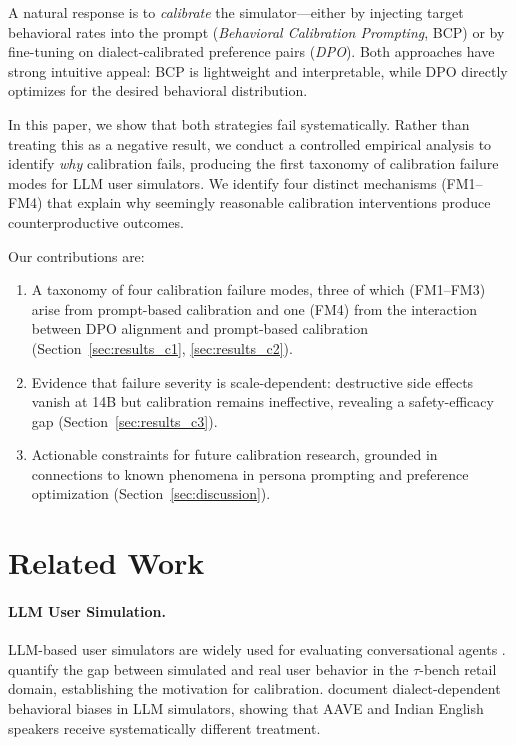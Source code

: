 \documentclass[11pt,a4paper]{article}
\newcommand{\fm}[1]{\textsc{FM#1}}
\newcommand{\bcp}{\textsc{BCP}}
\newcommand{\taubench}{$\tau$-bench}
\begin{document}
A natural response is to \emph{calibrate} the simulator---either by injecting target behavioral rates into the prompt (\emph{Behavioral Calibration Prompting}, \bcp{}) or by fine-tuning on dialect-calibrated preference pairs (\emph{DPO}).
Both approaches have strong intuitive appeal: \bcp{} is lightweight and interpretable, while DPO directly optimizes for the desired behavioral distribution.

In this paper, we show that both strategies fail systematically.
Rather than treating this as a negative result, we conduct a controlled empirical analysis to identify \emph{why} calibration fails, producing the first taxonomy of calibration failure modes for LLM user simulators.
We identify four distinct mechanisms (\fm{1}--\fm{4}) that explain why seemingly reasonable calibration interventions produce counterproductive outcomes.

Our contributions are:
\begin{enumerate}[nosep]
    \item A taxonomy of four calibration failure modes, three of which (\fm{1}--\fm{3}) arise from prompt-based calibration and one (\fm{4}) from the interaction between DPO alignment and prompt-based calibration (Section~\ref{sec:results_c1}, \ref{sec:results_c2}).
    \item Evidence that failure severity is scale-dependent: destructive side effects vanish at 14B but calibration remains ineffective, revealing a safety-efficacy gap (Section~\ref{sec:results_c3}).
    \item Actionable constraints for future calibration research, grounded in connections to known phenomena in persona prompting \cite{basil2025playing_pretend,hu2026expert_persona} and preference optimization \cite{lee2024dpo_toxicity} (Section~\ref{sec:discussion}).
\end{enumerate}

\section{Related Work}
\label{sec:related}

\paragraph{LLM User Simulation.}
LLM-based user simulators are widely used for evaluating conversational agents \cite{yao2024taubench}.
\citet{sim2real2026gap} quantify the gap between simulated and real user behavior in the \taubench{} retail domain, establishing the motivation for calibration.
\citet{seshadri2026lost} document dialect-dependent behavioral biases in LLM simulators, showing that AAVE and Indian English speakers receive systematically different treatment.
\end{document}
